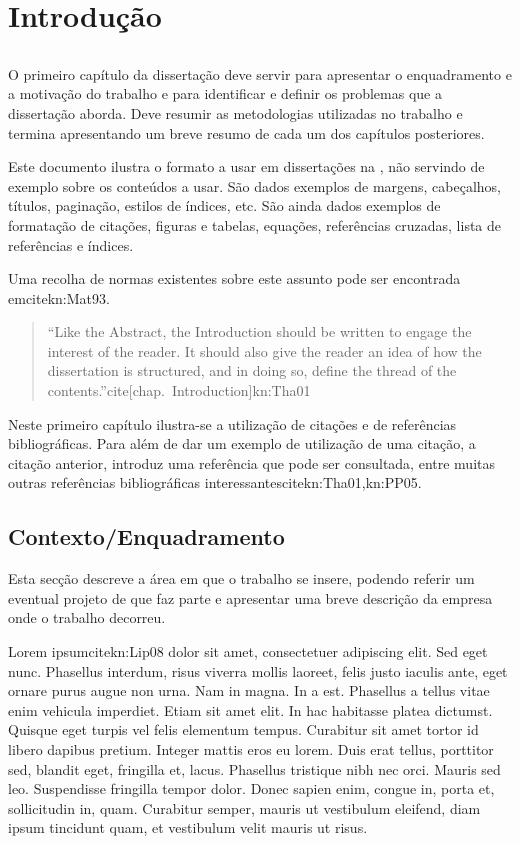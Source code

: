\chapter{Introdução} \label{chap:intro}

\section*{}

O primeiro capítulo da dissertação deve servir para apresentar o
enquadramento e a moti\-va\-ção do trabalho e para identificar e
definir os problemas que a dissertação aborda.
Deve resumir as metodologias utilizadas no trabalho e termina
apresentando um breve resumo de cada um dos capítulos
posteriores.

Este documento ilustra o formato a usar em dissertações na \Feup, não
servindo de exemplo sobre os conteúdos a usar.
São dados exemplos de margens, cabeçalhos, títulos, paginação, estilos
de índices, etc. 
São ainda dados exemplos de formatação de citações, figuras e tabelas,
equações, referências cruzadas, lista de referências e índices.

Uma recolha de normas existentes sobre este assunto pode ser
encontrada emcite{kn:Mat93}. 

\begin{quote}
  ``Like the Abstract, the Introduction should be written to engage the
  interest of the reader. It should also give the reader an idea of
  how the dissertation is structured, and in doing so, define the
  thread of the contents.''cite[chap.\ Introduction]{kn:Tha01} 
\end{quote}

Neste primeiro capítulo ilustra-se a utilização de citações e de
referências biblio\-grá\-fi\-cas.
Para além de dar um exemplo de utilização de uma citação, a citação
anterior, introduz uma referência que pode ser consultada, entre
muitas outras referências bibliográficas
interessantescite{kn:Tha01,kn:PP05}. 

\section{Contexto/Enquadramento} \label{sec:context}

Esta secção descreve a área em que o trabalho se insere, podendo
referir um eventual projeto de que faz parte e apresentar uma breve
descrição da empresa onde o trabalho decorreu.

Lorem ipsumcite{kn:Lip08} dolor sit amet, consectetuer adipiscing
elit. 
Sed eget nunc. Phasellus interdum, risus viverra mollis laoreet, felis
justo iaculis ante, eget ornare purus augue non urna. Nam in magna. In a
est. Phasellus a tellus vitae enim vehicula imperdiet. Etiam sit amet
elit. In hac habitasse platea dictumst. Quisque eget turpis vel felis
elementum tempus. Curabitur sit amet tortor id libero dapibus
pretium. Integer mattis eros eu lorem. Duis erat tellus, porttitor
sed, blandit eget, fringilla et, lacus. Phasellus tristique nibh nec
orci. Mauris sed leo. Suspendisse fringilla tempor dolor. Donec sapien
enim, congue in, porta et, sollicitudin in, quam. Curabitur semper,
mauris ut vestibulum eleifend, diam ipsum tincidunt quam, et
vestibulum velit mauris ut risus. 

